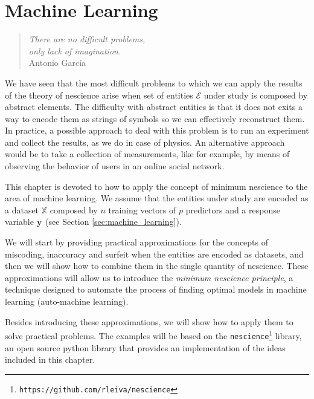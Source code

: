 %
%


\chapter{Machine Learning}
\label{chap:Machine-Learning}

\begin{quote}
\begin{flushright}
\emph{There are no difficult problems,\\
only lack of imagination.}\\
Antonio García \\
\end{flushright}
\end{quote}
\bigskip

We have seen that the most difficult problems to which we can apply the results of the theory of nescience arise when set of entities $\mathcal{E}$ under study is composed by abstract elements. The difficulty with abstract entities is that it does not exits a way to encode them as strings of symbols so we can effectively reconstruct them. In practice, a possible approach to deal with this problem is to run an experiment and collect the results, as we do in case of physics. An alternative approach would be to take a collection of measurements, like for example, by means of observing the behavior of users in an online social network.

This chapter is devoted to how to apply the concept of minimum nescience to the area of machine learning. We assume that the entities under study are encoded as a dataset $\mathbb{X}$ composed by $n$ training vectors of $p$ predictors and a response variable $\bold{y}$ (see Section \ref{sec:machine_learning}).

We will start by providing practical approximations for the concepts of miscoding, inaccuracy and surfeit when the entities are encoded as datasets, and then we will show how to combine them in the single quantity of nescience. These approximations will allow us to introduce the \emph{minimum nescience principle}, a technique designed to automate the process of finding optimal models in machine learning (auto-machine learning). 

Besides introducing these approximations, we will show how to apply them to solve practical problems. The examples will be based on the \texttt{nescience}\footnote{\texttt{https://github.com/rleiva/nescience}} library, an open source python library that provides an implementation of the ideas included in this chapter.

